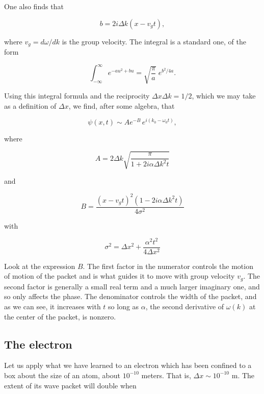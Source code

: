 One also finds that

\begin{equation}
  b = 2i\Delta k(x - v_g t),
\end{equation}

where $v_g = d\omega/dk$ is the group velocity.  The integral is a standard one, of the form

\begin{equation}
\int_{-\infty}^\infty e^{- au^2 + bu} = \sqrt{\frac{\pi}{a}}\; e^{ b^2/4a }.
\end{equation}

Using this integral  formula and the reciprocity $\Delta x\Delta k = 1/2$, which we may take as a definition of $\Delta x$, we find, after some algebra, that

\begin{equation}
\psi(x,t) \sim A e^{-B} \,e^{i(k_0 - \omega_0t)}
,
\end{equation}

where

\begin{equation}
A = 2\Delta k \sqrt{\frac{\pi}{1 + 2i\alpha \Delta k^2 t}}
\end{equation}

and

\begin{equation}
B = \frac{( x-v_gt )^2 (1 - 2i\alpha \Delta k^2 t)}{4\sigma^2}
\end{equation}

with

\begin{equation}
\sigma^2 = \Delta x^2 + \frac{\alpha^2 t^2}{4 \Delta x^2}
\end{equation}

Look at the expression $B$. The first factor in the numerator controls the motion of motion of the packet and is what guides it to move with group velocity $v_g$.  The second factor is generally a small real term and a much larger imaginary one, and so only affects the phase.  The denominator controls the width of the packet, and as we can see, it increases with $t$ so long as $\alpha$, the second derivative of $\omega(k)$ at the center of the packet, is nonzero.

\subsection{The electron}

Let us apply what we have learned to an electron which has been confined to a box about the size of an atom, about $10^{-10}$ meters. That is, $\Delta x \sim 10^{-10}\text{ m}$.  The extent of its wave packet will double when

